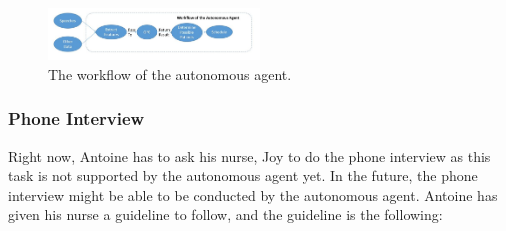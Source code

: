 \documentclass{article}
\begin{document}
	\begin{figure}[h]
	    \begin{center}
		\includegraphics[width=0.5\textwidth]{workflow_agent}
	    \end{center}
	    \caption{The workflow of the autonomous agent.}
	    \label{figure:workflow_agent}
	\end{figure}
	
	\subsubsection{Phone Interview}
	
Right now, Antoine has to ask his nurse, Joy to do the phone interview as this task is not supported by the autonomous agent yet. 
	In the future, the phone interview might be able to be conducted by the autonomous agent.
	Antoine has given his nurse a guideline to follow, and the guideline is the following:
	
\end{document}

